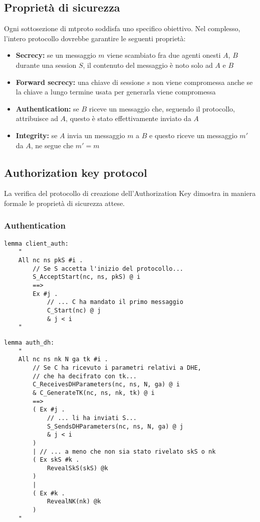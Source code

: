 \subsection{Proprietà di sicurezza}
Ogni sottosezione di \gls{mtproto} soddisfa uno specifico obiettivo.
Nel complesso, l'intero protocollo dovrebbe garantire le seguenti proprietà:
\begin{itemize}
    \item \textbf{Secrecy:} se un messaggio $m$ viene scambiato fra due agenti onesti $A$, $B$ durante una session $S$,
          il contenuto del messaggio è noto solo ad $A$ e $B$
    \item \textbf{Forward secrecy:} una chiave di sessione $s$ non viene compromessa
          anche se la chiave a lungo termine usata per generarla viene compromessa
    \item \textbf{Authentication:} se $B$ riceve un messaggio che, seguendo il protocollo,
          attribuisce ad $A$, questo è stato effettivamente inviato da $A$
    \item \textbf{Integrity:} se $A$ invia un messaggio $m$ a $B$
          e questo riceve un messaggio $m'$ da $A$, ne segue che $m' = m$
\end{itemize}

\subsection{Authorization key protocol}
La verifica del protocollo di creazione dell'Authorization Key dimostra in maniera formale le proprietà di sicurezza attese.

\subsubsection{Authentication}

\begin{lstlisting}[caption=Il client non è autenticato agli occhi del server.
    Anche un avversario può iniziare legittimamente il protocollo. Questo lemma è falso.,
    label=cod:lemma:client_auth]
lemma client_auth:
    "
    All nc ns pkS #i .
        // Se S accetta l'inizio del protocollo...
        S_AcceptStart(nc, ns, pkS) @ i
        ==>
        Ex #j . 
            // ... C ha mandato il primo messaggio
            C_Start(nc) @ j
            & j < i
    "
\end{lstlisting}

\begin{lstlisting}[caption={Se il client ha ricevuto i parametri relativi a DHE, è stato il server ad inviarli.},
    label=cod:lemma:auth_dh]
lemma auth_dh:
    "
    All nc ns nk N ga tk #i .
        // Se C ha ricevuto i parametri relativi a DHE,
        // che ha decifrato con tk...
        C_ReceivesDHParameters(nc, ns, N, ga) @ i
        & C_GenerateTK(nc, ns, nk, tk) @ i
        ==>
        ( Ex #j .
            // ... li ha inviati S...
            S_SendsDHParameters(nc, ns, N, ga) @ j
            & j < i
        )
        | // ... a meno che non sia stato rivelato skS o nk
        ( Ex skS #k .
            RevealSkS(skS) @k
        )
        |
        ( Ex #k .
            RevealNK(nk) @k
        )
    "
\end{lstlisting}

